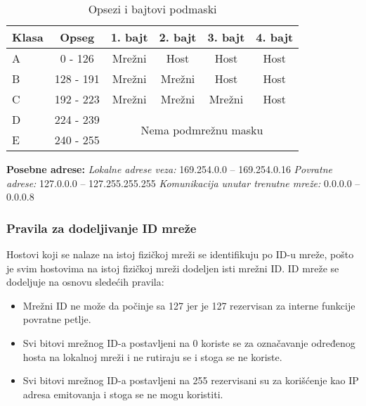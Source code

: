 \begin{table}[]
    \begin{center}
    \begin{tabular}{lc|cccc}
    Klasa & Opseg     & \multicolumn{1}{c|}{1. bajt} & \multicolumn{1}{c|}{2. bajt} & \multicolumn{1}{c|}{3. bajt} & 4. bajt \\ \hline\hline
    A     & 0 - 126   & \multicolumn{1}{c|}{Mrežni}  & \multicolumn{1}{c|}{Host}    & \multicolumn{1}{c|}{Host}    & Host    \\
    B     & 128 - 191 & \multicolumn{1}{c|}{Mrežni}  & \multicolumn{1}{c|}{Mrežni}  & \multicolumn{1}{c|}{Host}    & Host    \\
    C     & 192 - 223 & \multicolumn{1}{c|}{Mrežni}  & \multicolumn{1}{c|}{Mrežni}  & \multicolumn{1}{c|}{Mrežni}  & Host    \\ \cline{3-6} 
    D     & 224 - 239 & \multicolumn{4}{c}{\multirow{2}{*}{Nema podmrežnu masku}}                                            \\
    E     & 240 - 255 & \multicolumn{4}{c}{}                                                                             
    \end{tabular}
    \caption{Opsezi i bajtovi podmaski}
    \label{tab:klase_opsezi}
    \end{center}
\end{table}

\textbf{Posebne adrese: }
\emph{Lokalne adrese veza:} 169.254.0.0 – 169.254.0.16
\emph{Povratne adrese:} 127.0.0.0 – 127.255.255.255
\emph{Komunikacija unutar trenutne mreže:} 0.0.0.0 – 0.0.0.8

\subsubsection{Pravila za dodeljivanje ID mreže}
Hostovi koji se nalaze na istoj fizičkoj mreži se identifikuju po ID-u mreže, pošto je svim hostovima na istoj fizičkoj mreži dodeljen isti mrežni ID. ID mreže se dodeljuje na osnovu slede\'{c}ih pravila:
\begin{itemize}
    \item Mrežni ID ne može da počinje sa 127 jer je 127 rezervisan za interne funkcije povratne petlje.
    \item Svi bitovi mrežnog ID-a postavljeni na 0 koriste se za označavanje određenog hosta na lokalnoj mreži i ne rutiraju se i stoga se ne koriste.
    \item Svi bitovi mrežnog ID-a postavljeni na 255 rezervisani su za koriš\'{c}enje kao IP adresa emitovanja i stoga se ne mogu koristiti.
\end{itemize}

